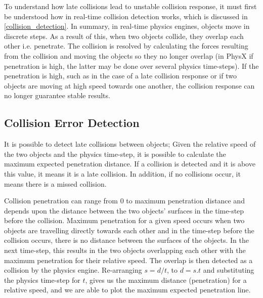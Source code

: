 
To understand how late collisions lead to unstable collision response, it must first be understood how in real-time collision detection works, which is discussed in \ref{collision_detection}. In summary, in real-time physics engines, objects move in discrete steps. As a result of this, when two objects collide, they overlap each other i.e. penetrate. The collision is resolved by calculating the forces resulting from the collision and moving the objects so they no longer overlap (in PhysX if penetration is high, the latter may be done over several physics time-steps). If the penetration is high, such as in the case of a late collision response or if two objects are moving at high speed towards one another, the collision response can no longer guarantee stable results.

\subsection{Collision Error Detection}
It is possible to detect late collisions between objects; Given the relative speed of the two objects and the physics time-step, it is possible to calculate the maximum expected penetration distance. If a collision is detected and it is above this value, it means it is a late collision. In addition, if no collisions occur, it means there is a missed collision.

Collision penetration can range from 0 to maximum penetration distance and depends upon the distance between the two objects' surfaces in the time-step before the collision. Maximum penetration for a given speed occurs when two objects are travelling directly towards each other and in the time-step before the collision occurs, there is no distance between the surfaces of the objects. In the next time-step, this results in the two objects overlapping each other with the maximum penetration for their relative speed. The overlap is then detected as a collision by the physics engine. Re-arranging $s=d/t$, to $d=s.t$ and substituting the physics time-step for $t$, gives us the maximum distance (penetration) for a relative speed, and we are able to plot the maximum expected penetration line.



